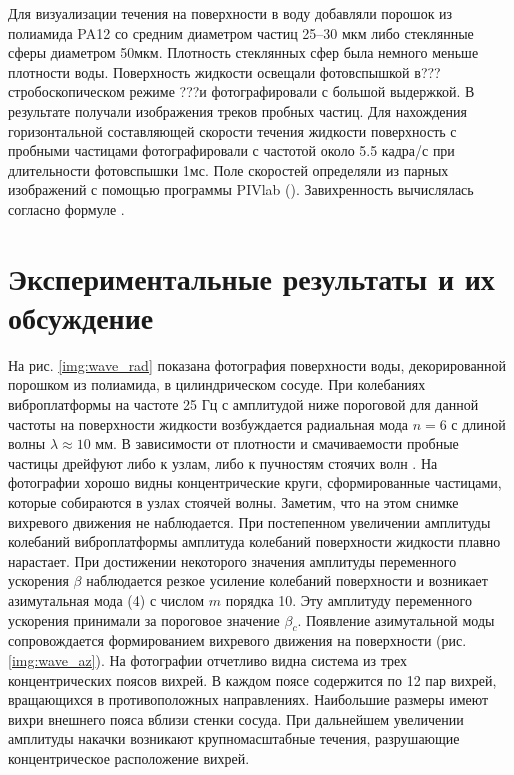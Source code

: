 %
%
Для визуализации течения на поверхности в воду добавляли порошок из полиамида PA12 со средним диаметром частиц 25–30 мкм либо стеклянные сферы диаметром 50мкм. Плотность стеклянных сфер была немного меньше плотности воды. Поверхность жидкости освещали фотовспышкой в??? стробоскопическом режиме ???и фотографировали с большой выдержкой. В результате получали изображения треков пробных частиц. Для нахождения горизонтальной составляющей скорости течения жидкости поверхность с пробными частицами фотографировали с частотой около 5.5 кадра/с при длительности фотовспышки 1мс. Поле скоростей определяли из парных изображений с помощью программы PIVlab \cite{PIVlab}(). 
Завихренность вычислялась согласно формуле .
%


\section{Экспериментальные результаты и их обсуждение} \label{sect3_3} На рис. \ref{img:wave_rad} показана фотография поверхности воды, декорированной порошком из полиамида, в цилиндрическом сосуде. При колебаниях виброплатформы на частоте 25 Гц с амплитудой ниже пороговой для данной частоты на поверхности жидкости возбуждается радиальная мода $n = 6$ с длиной волны $\lambda \approx 10$ мм. В зависимости от плотности и смачиваемости пробные частицы дрейфуют либо к узлам, либо к пучностям стоячих волн \cite{Lukaschuk}. На фотографии хорошо видны концентрические круги, сформированные частицами, которые собираются в узлах стоячей волны. Заметим, что на этом снимке вихревого движения не наблюдается. При постепенном увеличении амплитуды колебаний виброплатформы амплитуда колебаний поверхности жидкости плавно нарастает. При достижении некоторого значения амплитуды переменного ускорения $\beta$ наблюдается резкое усиление колебаний поверхности и возникает азимутальная мода (4) с числом $m$ порядка 10. Эту амплитуду переменного ускорения принимали за пороговое значение $\beta_c$. Появление азимутальной моды сопровождается формированием вихревого движения на поверхности (рис. \ref{img:wave_az}). На фотографии отчетливо видна система из трех концентрических поясов вихрей. В каждом поясе содержится по 12 пар вихрей, вращающихся в противоположных направлениях. Наибольшие размеры имеют вихри внешнего пояса вблизи стенки сосуда. При дальнейшем увеличении амплитуды накачки возникают крупномасштабные течения, разрушающие концентрическое расположение вихрей.

